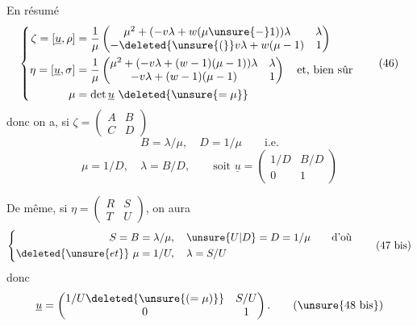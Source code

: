 En résumé
\[
\left\{\begin{aligned}
\zeta=[\underline u,\rho]
&=\frac1\mu\begin{pmatrix}
\mu^2+(-v\lambda+w(\mu\unsure{-}1))\lambda&\lambda\\
-\deleted{\unsure{(}}v\lambda+w(\mu-1)&1
\end{pmatrix}\\
\eta=[\underline u,\sigma]
&=\frac1\mu\begin{pmatrix}
\mu^2+(-v\lambda+(w-1)(\mu-1))\lambda&\lambda\\
-v\lambda+(w-1)(\mu-1)&1
\end{pmatrix}\quad\text{et, bien sûr}\\
\mu&=\det\underline u\ \deleted{\unsure{=\mu}}
\end{aligned}\right. \tag{46}
\]
donc on a, si $\zeta=\begin{pmatrix}A&B\\C&D\end{pmatrix}$
\[
B=\lambda/\mu,\quad D=1/\mu\qquad\text{i.e.} \tag{47}
\]
\[
\mu=1/D,\quad\lambda=B/D,\qquad\text{soit }\underline u=\begin{pmatrix}1/D&B/D\\0&1\end{pmatrix} \tag{48}
\]


De même, si $\eta=\begin{pmatrix}R&S\\T&U\end{pmatrix}$, on aura 
\[
\left\{\begin{aligned}
S=B&=\lambda/\mu,\quad \unsure{U|D}=D=1/\mu\qquad\text{d'où}\\
\deleted{\unsure{et}}\ \mu&=1/U,\quad\lambda=S/U
\end{aligned}\right. \tag{47 bis}
\]
donc
\[
\underline u=\begin{pmatrix}1/U\deleted{\unsure{(=\mu)}}&S/U\\0&1\end{pmatrix}. \tag{\unsure{48 bis}}
\]

